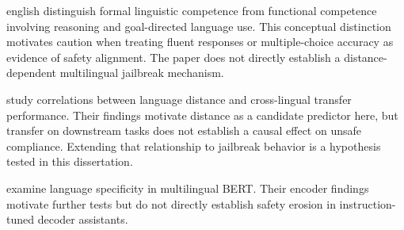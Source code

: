 \begin{otherlanguage*}{english}
\textcite{mahowaldDissociatingLanguageThought2024} distinguish formal linguistic competence from functional competence involving reasoning and goal-directed language use. This conceptual distinction motivates caution when treating fluent responses or multiple-choice accuracy as evidence of safety alignment. The paper does not directly establish a distance-dependent multilingual jailbreak mechanism.
	
\textcite{philippyIdentifyingCorrelationLanguage2023} study correlations between language distance and cross-lingual transfer performance. Their findings motivate distance as a candidate predictor here, but transfer on downstream tasks does not establish a causal effect on unsafe compliance. Extending that relationship to jailbreak behavior is a hypothesis tested in this dissertation.

\textcite{tantiLanguagespecificityMultilingualBERT2021} examine language specificity in multilingual BERT. Their encoder findings motivate further tests but do not directly establish safety erosion in instruction-tuned decoder assistants.


\end{otherlanguage*}
